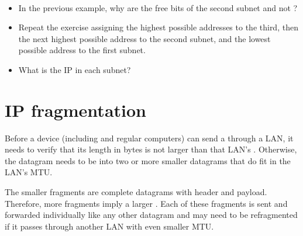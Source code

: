 \begin{exercise}\ \\[-0.5cm]
\begin{itemize}
\item In the previous example, why are the free bits of the second subnet  
and not ?\\[-0.4cm]

\item Repeat the exercise assigning the highest possible addresses to the third,
  then the next highest possible address to the second subnet, 
  and the lowest possible address to the first subnet.\\[-0.4cm]
  
\item What is the  IP in each subnet?
\end{itemize}
\end{exercise}


% 
\section{IP fragmentation}
\label{sec:layer3:fragmentation}

Before a device (including  and regular computers)
can send a  through a LAN, it needs to verify that its length in bytes 
is not larger than that LAN's . Otherwise, the datagram needs to be 
 into two or more smaller datagrams that do fit in the LAN's MTU.

The smaller fragments are complete datagrams with header and payload. Therefore, 
more fragments imply a larger . Each of these fragments is sent 
and forwarded individually like any other datagram and may need to be refragmented 
if it passes through another LAN with even smaller MTU.

